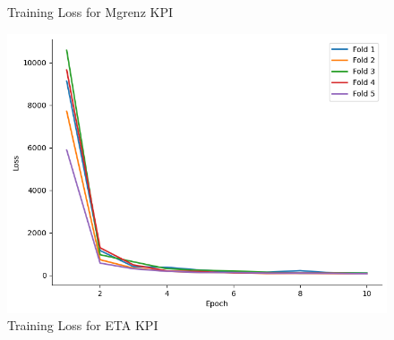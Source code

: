 \documentclass{report} %
\begin{document}
\begin{figure}[H]
\begin{minipage}[b]{0.325\textwidth}
        \caption{\centering Training Loss for Mgrenz \ac{KPI}}
        \label{fig:Training Loss for Torque Curve}
    \end{minipage}
    \hfill
    \begin{minipage}[b]{0.325\textwidth}
        \includegraphics[width=\textwidth]{./ReportImages/train_loss_y2.png}
        \caption{\centering Training Loss for ETA \ac{KPI}}
        \label{fig:Training Loss for ETA grid}
    \end{minipage}
\end{figure}
\end{document}
